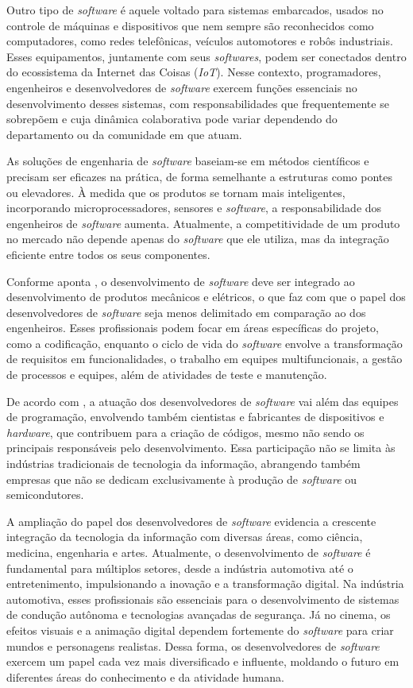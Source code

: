 \documentclass[english,brazilian]{UNISINOSartigo} %
\begin{document}
Outro tipo de \textit{software} é aquele voltado para sistemas embarcados, usados no controle de máquinas e dispositivos que nem sempre são reconhecidos como computadores, como redes telefônicas, veículos automotores e robôs industriais. Esses equipamentos, juntamente com seus \textit{softwares}, podem ser conectados dentro do ecossistema da Internet das Coisas (\textit{IoT}). Nesse contexto, programadores, engenheiros e desenvolvedores de \textit{software} exercem funções essenciais no desenvolvimento desses sistemas, com responsabilidades que frequentemente se sobrepõem e cuja dinâmica colaborativa pode variar dependendo do departamento ou da comunidade em que atuam.

As soluções de engenharia de \textit{software} baseiam-se em métodos científicos e precisam ser eficazes na prática, de forma semelhante a estruturas como pontes ou elevadores. À medida que os produtos se tornam mais inteligentes, incorporando microprocessadores, sensores e \textit{software}, a responsabilidade dos engenheiros de \textit{software} aumenta. Atualmente, a competitividade de um produto no mercado não depende apenas do \textit{software} que ele utiliza, mas da integração eficiente entre todos os seus componentes.

Conforme aponta , o desenvolvimento de \textit{software} deve ser integrado ao desenvolvimento de produtos mecânicos e elétricos, o que faz com que o papel dos desenvolvedores de \textit{software} seja menos delimitado em comparação ao dos engenheiros. Esses profissionais podem focar em áreas específicas do projeto, como a codificação, enquanto o ciclo de vida do \textit{software} envolve a transformação de requisitos em funcionalidades, o trabalho em equipes multifuncionais, a gestão de processos e equipes, além de atividades de teste e manutenção.

De acordo com , a atuação dos desenvolvedores de \textit{software} vai além das equipes de programação, envolvendo também cientistas e fabricantes de dispositivos e \textit{hardware}, que contribuem para a criação de códigos, mesmo não sendo os principais responsáveis pelo desenvolvimento. Essa participação não se limita às indústrias tradicionais de tecnologia da informação, abrangendo também empresas que não se dedicam exclusivamente à produção de \textit{software} ou semicondutores.

A ampliação do papel dos desenvolvedores de \textit{software} evidencia a crescente integração da tecnologia da informação com diversas áreas, como ciência, medicina, engenharia e artes. Atualmente, o desenvolvimento de \textit{software} é fundamental para múltiplos setores, desde a indústria automotiva até o entretenimento, impulsionando a inovação e a transformação digital. Na indústria automotiva, esses profissionais são essenciais para o desenvolvimento de sistemas de condução autônoma e tecnologias avançadas de segurança. Já no cinema, os efeitos visuais e a animação digital dependem fortemente do \textit{software} para criar mundos e personagens realistas. Dessa forma, os desenvolvedores de \textit{software} exercem um papel cada vez mais diversificado e influente, moldando o futuro em diferentes áreas do conhecimento e da atividade humana.
\end{document}
